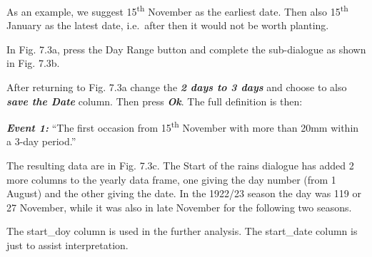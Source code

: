 \documentclass[
  letterpaper,
  DIV=11,
  numbers=noendperiod]{scrreprt}
\begin{document}
As an example, we suggest 15\textsuperscript{th} November as the
earliest date. Then also 15\textsuperscript{th} January as the latest
date, i.e.~after then it would not be worth planting.

In Fig. 7.3a, press the Day Range button and complete the sub-dialogue
as shown in Fig. 7.3b.

After returning to Fig. 7.3a change the \textbf{\emph{2 days to 3 days}}
and choose to also \textbf{\emph{save the Date}} column. Then press
\textbf{\emph{Ok}}. The full definition is then:

\textbf{\emph{Event 1:}} ``The first occasion from
15\textsuperscript{th} November with more than 20mm within a 3-day
period.''

The resulting data are in Fig. 7.3c. The Start of the rains dialogue has
added 2 more columns to the yearly data frame, one giving the day number
(from 1 August) and the other giving the date. In the 1922/23 season the
day was 119 or 27 November, while it was also in late November for the
following two seasons.

The start\_doy column is used in the further analysis. The start\_date
column is just to assist interpretation.
\end{document}
